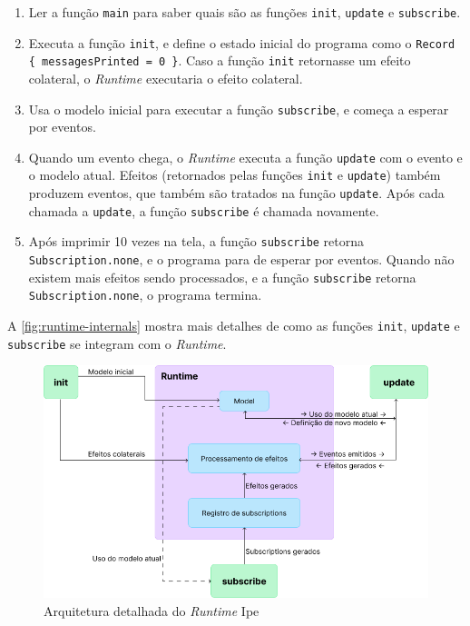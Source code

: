 \begin{enumerate}
    \item Ler a função \texttt{main} para saber quais são as funções \texttt{init},
          \texttt{update} e \texttt{subscribe}.
    \item Executa a função \texttt{init}, e define o estado inicial do programa
          como o \texttt{Record} \texttt{\{ messagesPrinted = 0 \}}. Caso a função \texttt{init}
          retornasse um efeito colateral, o \textit{Runtime} executaria o efeito colateral.
    \item Usa o modelo inicial para executar a função \texttt{subscribe}, e
          começa a esperar por eventos.
    \item Quando um evento chega, o \textit{Runtime} executa a função \texttt{update}
          com o evento e o modelo atual. Efeitos (retornados pelas funções \texttt{init}
          e \texttt{update}) também produzem eventos, que também são tratados na função
          \texttt{update}. Após cada chamada a \texttt{update}, a função \texttt{subscribe}
          é chamada novamente.
    \item Após imprimir 10 vezes na tela, a função \texttt{subscribe} retorna
          \texttt{Subscription.none}, e o programa para de esperar por eventos.
          Quando não existem mais efeitos sendo processados, e a função \texttt{subscribe}
          retorna \texttt{Subscription.none}, o programa termina.
\end{enumerate}

A \autoref{fig:runtime-internals} mostra mais detalhes de como as funções \texttt{init},
\texttt{update} e \texttt{subscribe} se integram com o \textit{Runtime}.

\begin{figure}[htb]
    \caption{Arquitetura detalhada do \textit{Runtime} Ipe}
    \label{fig:runtime-internals}
    \begin{center}
        \includegraphics[scale=0.5]{pictures/runtime-internals.png}
    \end{center}
\end{figure}

